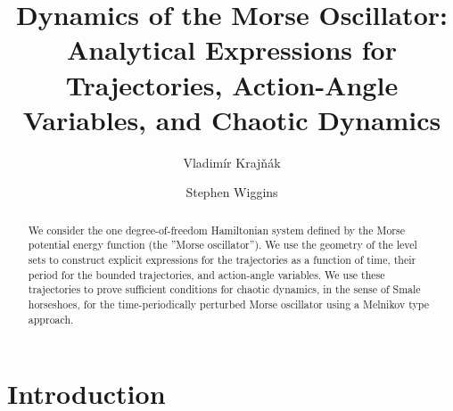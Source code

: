 \documentclass{ws-ijbc}
\begin{document}
\catchline{}{}{}{}{} %


\title{Dynamics of the Morse Oscillator: Analytical Expressions for Trajectories, Action-Angle Variables, and Chaotic Dynamics}


\author{Vladim{\'i}r Kraj{\v{n}}{\'a}k}
\address{School of Mathematics \\
University of Bristol\\Bristol BS8 1TW\\United Kingdom\\
v.krajnak@bristol.ac.uk}

\author{Stephen Wiggins}
\address{School of Mathematics \\
University of Bristol\\Bristol BS8 1TW\\United Kingdom\\
s.wiggins@bristol.ac.uk}

\maketitle

\begin{history}
\end{history}

\begin{abstract}
We consider the one degree-of-freedom Hamiltonian system defined by the Morse potential energy function (the ''Morse oscillator''). We use the geometry of the level sets to construct explicit expressions for the trajectories as a function of time, their period for the bounded trajectories, and action-angle variables. We use these trajectories to prove sufficient conditions for chaotic dynamics, in the sense of Smale horseshoes, for the time-periodically perturbed Morse oscillator using a Melnikov type approach.
\end{abstract}


\section{Introduction}
\label{sec:intro}
\end{document}
